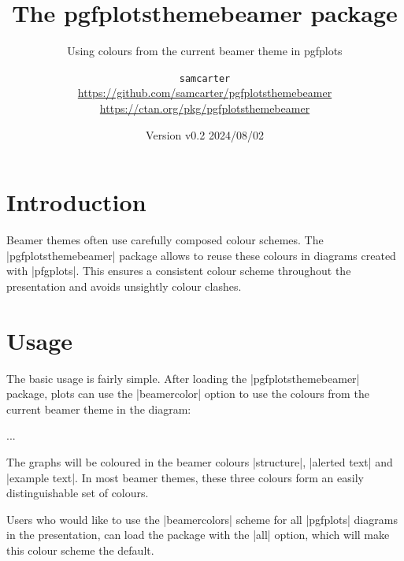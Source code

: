 \documentclass{scrartcl}
\title{The pgfplotsthemebeamer package}
\subtitle{Using colours from the current beamer theme in pgfplots}
\author{%
  \texorpdfstring{
    \texttt{samcarter}\\
    \url{https://github.com/samcarter/pgfplotsthemebeamer}\\
    \url{https://ctan.org/pkg/pgfplotsthemebeamer}
  }{samcarter}}
\date{Version v0.2 \textendash{} 2024/08/02}
\begin{document}
\maketitle

\section{Introduction}
\label{intro}

Beamer themes often use carefully composed colour schemes. The \saminline|pgfplotsthemebeamer| package allows to reuse these colours in diagrams created with \saminline|pfgplots|. This ensures a consistent colour scheme throughout the presentation and avoids unsightly colour clashes.

\blurb

\section{Usage}

The basic usage is fairly simple. After loading the \saminline|pgfplotsthemebeamer| package, plots can use the \saminline|beamercolor| option to use the colours from the current beamer theme in the diagram:
\begin{tcolorbox}[title={Usage}]
\begin{samcode}
\usepackage{pgfplotsthemebeamer}

\begin{axis}[
  beamercolors
]
...
\end{axis}
\end{samcode}
\end{tcolorbox}
The graphs will be coloured in the beamer colours \saminline|structure|, \saminline|alerted text| and \saminline|example text|. In most beamer themes, these three colours form an easily distinguishable set of colours.

Users who would like to use the \saminline|beamercolors| scheme for all \saminline|pgfplots| diagrams in the presentation, can load the package with the \saminline|all| option, which will make this colour scheme the default.
\begin{tcolorbox}[title={Usage}]
\begin{samcode}
\usepackage[all]{pgfplotsthemebeamer}
\end{samcode}
\end{tcolorbox}
\end{document}
